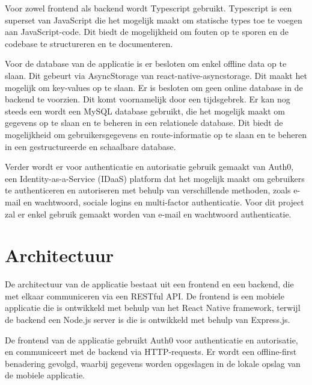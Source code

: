 \vspace{1cm}


Voor zowel frontend als backend wordt Typescript gebruikt. Typescript is een superset van JavaScript die het mogelijk maakt om statische types toe te voegen aan JavaScript-code. Dit biedt de mogelijkheid om fouten op te sporen en de codebase te structureren en te documenteren.

\vspace{1cm}


Voor de database van de applicatie is er besloten om enkel offline data op te slaan. Dit gebeurt via AsyncStorage van react-native-asyncstorage. Dit maakt het mogelijk om key-values op te slaan. 
Er is besloten om geen online database in de backend te voorzien. Dit komt voornamelijk door een tijdsgebrek.
Er kan nog steeds een wordt een MySQL database gebruikt, die het mogelijk maakt om gegevens op te slaan en te beheren in een relationele database. Dit biedt de mogelijkheid om gebruikersgegevens en route-informatie op te slaan en te beheren in een gestructureerde en schaalbare database.

\vspace{1cm}


Verder wordt er voor authenticatie en autorisatie gebruik gemaakt van Auth0, een Identity-as-a-Service (IDaaS) platform dat het mogelijk maakt om gebruikers te authenticeren en autoriseren met behulp van verschillende methoden, zoals e-mail en wachtwoord, sociale logins en multi-factor authenticatie. Voor dit project zal er enkel gebruik gemaakt worden van e-mail en wachtwoord authenticatie.

\section{Architectuur}

De architectuur van de applicatie bestaat uit een frontend en een backend, die met elkaar communiceren via een RESTful API. De frontend is een mobiele applicatie die is ontwikkeld met behulp van het React Native framework, terwijl de backend een Node.js server is die is ontwikkeld met behulp van Express.js.

\vspace{1cm}


De frontend van de applicatie gebruikt Auth0 voor authenticatie en autorisatie, en communiceert met de backend via HTTP-requests. Er wordt een offline-first benadering gevolgd, waarbij gegevens worden opgeslagen in de lokale opslag van de mobiele applicatie.

